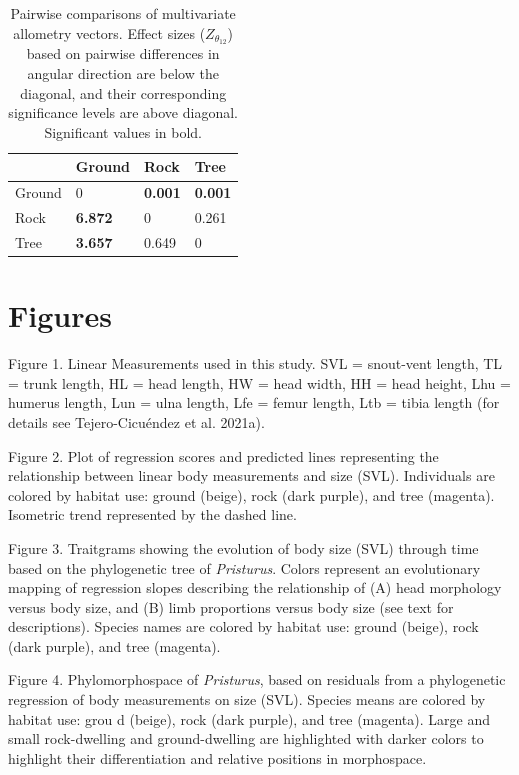 \documentclass[
  11pt,
]{article}
\begin{document}
\newpage

\begin{table}[H]

\caption{\label{tab:unnamed-chunk-2}Pairwise comparisons of multivariate allometry vectors. Effect sizes ($Z_{\theta_{12}}$) based on pairwise differences in angular direction are below the diagonal, and their corresponding significance levels are above diagonal. Significant values in bold.}
\centering
\begin{tabular}[t]{llll}
\toprule
  & Ground & Rock & Tree\\
\midrule
Ground & 0 & \textbf{0.001} & \textbf{0.001}\\
Rock & \textbf{6.872} & 0 & 0.261\\
Tree & \textbf{3.657} & 0.649 & 0\\
\bottomrule
\end{tabular}
\end{table}

\newpage

\hypertarget{figures}{%
\section{Figures}\label{figures}}

Figure 1. Linear Measurements used in this study. SVL = snout-vent
length, TL = trunk length, HL = head length, HW = head width, HH = head
height, Lhu = humerus length, Lun = ulna length, Lfe = femur length, Ltb
= tibia length (for details see Tejero-Cicuéndez et al. 2021a).
\hfill\break

Figure 2. Plot of regression scores and predicted lines representing the
relationship between linear body measurements and size (SVL).
Individuals are colored by habitat use: ground (beige), rock (dark
purple), and tree (magenta). Isometric trend represented by the dashed
line. \hfill\break

Figure 3. Traitgrams showing the evolution of body size (SVL) through
time based on the phylogenetic tree of \emph{Pristurus}. Colors
represent an evolutionary mapping of regression slopes describing the
relationship of (A) head morphology versus body size, and (B) limb
proportions versus body size (see text for descriptions). Species names
are colored by habitat use: ground (beige), rock (dark purple), and tree
(magenta). \hfill\break

Figure 4. Phylomorphospace of \emph{Pristurus}, based on residuals from
a phylogenetic regression of body measurements on size (SVL). Species
means are colored by habitat use: grou d (beige), rock (dark purple),
and tree (magenta). Large and small rock-dwelling and ground-dwelling
are highlighted with darker colors to highlight their differentiation
and relative positions in morphospace.
\end{document}
